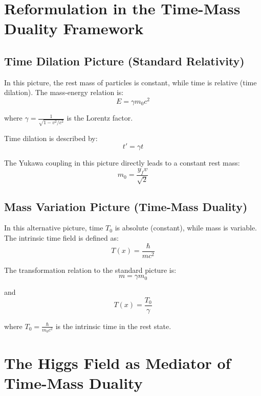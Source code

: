 \documentclass[a4paper,12pt]{article}
\newcommand{\Tfield}{T(x)} %
\begin{document}
	\section{Reformulation in the Time-Mass Duality Framework}
	
	\subsection{Time Dilation Picture (Standard Relativity)}
	
	In this picture, the rest mass of particles is constant, while time is relative (time dilation). The mass-energy relation is:
	\begin{equation}
		E = \gamma m_0 c^2
	\end{equation}
	
	where $\gamma = \frac{1}{\sqrt{1-v^2/c^2}}$ is the Lorentz factor.
	
	Time dilation is described by:
	\begin{equation}
		t' = \gamma t
	\end{equation}
	
	The Yukawa coupling in this picture directly leads to a constant rest mass:
	\begin{equation}
		m_0 = \frac{y_f v}{\sqrt{2}}
	\end{equation}
	
	\subsection{Mass Variation Picture (Time-Mass Duality)}
	
	In this alternative picture, time $T_0$ is absolute (constant), while mass is variable. The intrinsic time field is defined as:
	\begin{equation}
		\Tfield = \frac{\hbar}{m c^2}
	\end{equation}
	
	The transformation relation to the standard picture is:
	\begin{equation}
		m = \gamma m_0
	\end{equation}
	
	and
	\begin{equation}
		\Tfield = \frac{T_0}{\gamma}
	\end{equation}
	
	where $T_0 = \frac{\hbar}{m_0 c^2}$ is the intrinsic time in the rest state.
	
	\section{The Higgs Field as Mediator of Time-Mass Duality}
	
\end{document}
